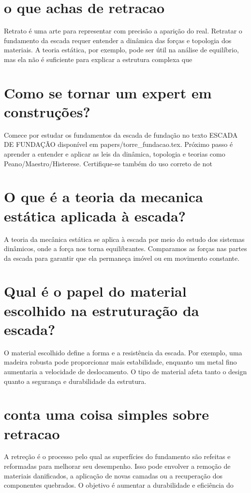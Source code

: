 \documentclass[11pt,a4paper]{article}
\begin{document}
\section{o que achas de retracao}
Retrato é uma arte para representar com precisão a aparição do real. Retratar o fundamento da escada requer entender a dinâmica das forças e topologia dos materiais. A teoria estática, por exemplo, pode ser útil na análise de equilíbrio, mas ela não é suficiente para explicar a estrutura complexa que

\section{Como se tornar um expert em construções?}
Comece por estudar os fundamentos da escada de fundação no texto ESCADA DE FUNDAÇÃO disponível em papers/torre\_fundacao.tex. Próximo passo é aprender a entender e aplicar as leis da dinâmica, topologia e teorias como Peano/Maestro/Histerese. Certifique-se também do uso correto de not

\section{O que é a teoria da mecanica estática aplicada à escada?}
A teoria da mecânica estática se aplica à escada por meio do estudo dos sistemas dinâmicos, onde a força nos torna equilibrantes. Comparamos as forças nas partes da escada para garantir que ela permaneça imóvel ou em movimento constante.

\section{Qual é o papel do material escolhido na estruturação da escada?}
O material escolhido define a forma e a resistência da escada. Por exemplo, uma madeira robusta pode proporcionar mais estabilidade, enquanto um metal fino aumentaria a velocidade de deslocamento. O tipo de material afeta tanto o design quanto a segurança e durabilidade da estrutura.

\section{conta uma coisa simples sobre retracao}
A retreção é o processo pelo qual as superfícies do fundamento são refeitas e reformadas para melhorar seu desempenho. Isso pode envolver a remoção de materiais danificados, a aplicação de novas camadas ou a recuperação dos componentes quebrados. O objetivo é aumentar a durabilidade e eficiência do
\end{document}
